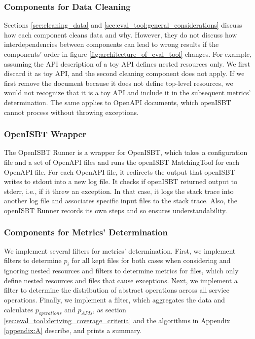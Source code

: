 \subsubsection{Components for Data Cleaning}
Sections \ref{sec:cleaning_data} and \ref{sec:eval_tool:general_considerations} discuss how each component cleans data and why.  However, they do not discuss how interdependencies between components can lead to wrong results if the components' order in figure \ref{fig:architecture_of_eval_tool}  changes. 
For example, assuming the API description of a toy API defines nested resources only. 
We first discard it as toy API, and the second cleaning component does not apply. If we first remove the document because it does not define top-level resources, we would not recognize that it is a toy API and include it in the subsequent metrics' determination. The same applies to OpenAPI documents, which openISBT cannot process without throwing exceptions.   


\subsubsection{OpenISBT Wrapper}
The OpenISBT Runner is a wrapper for OpenISBT, which takes a configuration file and a set of OpenAPI files and runs the openISBT MatchingTool for each OpenAPI file. For each OpenAPI file, it redirects the output that openISBT writes to stdout into a new log file. It checks if openISBT returned output to stderr, i.e., if it threw an exception. In that case, it logs the stack trace into another log file and associates specific input files to the stack trace. Also, the openISBT Runner records its own steps and so ensures understandability. 

\subsubsection{Components for Metrics' Determination}
We implement several filters for metrics' determination. First, we implement filters to determine $p_i$ for all kept files for both cases when considering and ignoring nested resources and filters to determine metrics for files, which only define nested resources and files that cause exceptions. Next, we implement a filter to determine the distribution of abstract operations across all service operations. Finally, we implement a filter, which aggregates the data and calculates $p_{operations}$ and $p_{APIs}$, as section \ref{sec:eval_tool:deriving_coverage_criteria} and the algorithms in Appendix \ref{appendix:A} describe, and prints a summary. 